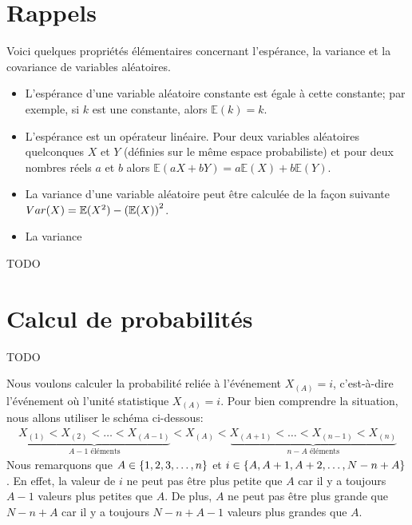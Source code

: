 \documentclass[10pt]{article}
\begin{document}
\appendix

\hypertarget{rappels}{%
\section{\texorpdfstring{Rappels
\label{rappel_esperance}}{Rappels }}\label{rappels}}

Voici quelques propriétés élémentaires concernant l'espérance, la
variance et la covariance de variables aléatoires.

\begin{itemize}
\item
  L'espérance d'une variable aléatoire constante est égale à cette
  constante; par exemple, si \(k\) est une constante, alors
  \(\mathbb{E}(k)=k\).
\item
  L'espérance est un opérateur linéaire. Pour deux variables aléatoires
  quelconques \(X\) et \(Y\) (définies sur le même espace probabiliste)
  et pour deux nombres réels \(a\) et \(b\) alors
  \(\mathbb{E}(aX+bY)=a\mathbb{E}(X)+b\mathbb{E}(Y)\).
\item
  La variance d'une variable aléatoire peut être calculée de la façon
  suivante \(Var(X)=\mathbb{E}(X^2)-\left(\mathbb{E}(X)\right)^2\).
\item
  La variance
\end{itemize}

TODO

\hypertarget{calcul-de-probabilites}{%
\section{\texorpdfstring{Calcul de probabilités
\label{calculs_proba}}{Calcul de probabilités }}\label{calcul-de-probabilites}}

TODO

Nous voulons calculer la probabilité reliée à l'événement \(X_{(A)}=i\),
c'est-à-dire l'événement où l'unité statistique \(X_{(A)}=i\). Pour bien
comprendre la situation, nous allons utiliser le schéma ci-dessous:
\begin{align*}
\underbrace{X_{(1)} <  X_{(2)} < \ldots < X_{(A-1)}}_{A-1 \text{ éléments}} 
< X_{(A)} 
< \underbrace{X_{(A+1)} < \ldots < X_{(n-1)} < X_{(n)}}_{n-A \text{ éléments}}
\end{align*} Nous remarquons que \(A\in\left\{1,2,3,\ldots, n\right\}\) et
\(i\in\left\{A,A+1,A+2,\ldots,N-n+A\right\}\). En effet, la valeur de \(i\) ne
peut pas être plus petite que \(A\) car il y a toujours \(A-1\) valeurs
plus petites que \(A\). De plus, \(A\) ne peut pas être plus grande que
\(N-n+A\) car il y a toujours \(N-n+A-1\) valeurs plus grandes que
\(A\).
\end{document}

